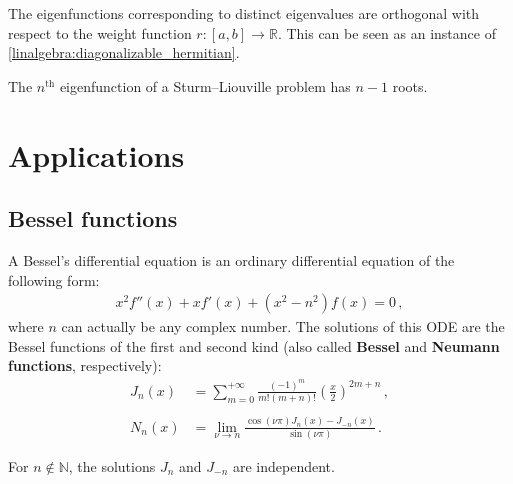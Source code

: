     \begin{property}
        The eigenfunctions corresponding to distinct eigenvalues are orthogonal with respect to the weight function $r:[a,b]\rightarrow\mathbb{R}$. This can be seen as an instance of \cref{linalgebra:diagonalizable_hermitian}.
    \end{property}

    \begin{theorem}
        The $n^{\text{th}}$ eigenfunction of a Sturm--Liouville problem has $n-1$ roots.
    \end{theorem}

\section{Applications}
\subsection{Bessel functions}

    A Bessel's differential equation is an ordinary differential equation of the following form:
    \begin{gather}
        \label{ode:bessel_ode}
        x^2f''(x) + xf'(x) + (x^2 - n^2)f(x) = 0\,,
    \end{gather}
    where $n$ can actually be any complex number. The solutions of this ODE are the Bessel functions of the first and second kind (also called \textbf{Bessel} and \textbf{Neumann functions}, respectively):
    \begin{align}
        \label{ode:bessel_function}
        J_n(x) &= \sum_{m=0}^{+\infty}\frac{(-1)^m}{m!(m+n)!}\left(\frac{x}{2}\right)^{2m+n}\,,\\\nonumber\\
        \label{ode:neumann_function}
        N_n(x) &= \lim_{\nu\rightarrow n}\frac{\cos(\nu\pi)J_n(x) - J_{-n}(x)}{\sin(\nu\pi)}\,.
    \end{align}

    \begin{property}
        For $n\not\in\mathbb{N}$, the solutions $J_n$ and $J_{-n}$ are independent.
    \end{property}

